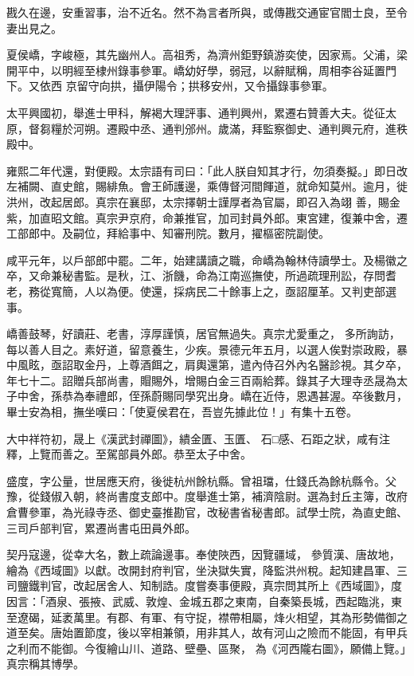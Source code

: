 \begin{pinyinscope}
 戡久在邊，安重習事，治不近名。然不為言者所與，或傳戡交通宦官閻士良，至令妻出見之。



 夏侯嶠，字峻極，其先幽州人。高祖秀，為濟州鉅野鎮游奕使，因家焉。父浦，梁開平中，以明經至棣州錄事參軍。嶠幼好學，弱冠，以辭賦稱，周相李谷延置門下。又依西
 京留守向拱，攝伊陽令；拱移安州，又令攝錄事參軍。



 太平興國初，舉進士甲科，解褐大理評事、通判興州，累遷右贊善大夫。從征太原，督芻糧於河朔。遷殿中丞、通判邠州。歲滿，拜監察御史、通判興元府，進秩殿中。



 雍熙二年代還，對便殿。太宗語有司曰：「此人朕自知其才行，勿須奏擬。」即日改左補闕、直史館，賜緋魚。會王師護邊，乘傳督河間餫道，就命知莫州。逾月，徙洪州，改起居郎。真宗在襄邸，太宗擇朝士謹厚者為官屬，即召入為翊
 善，賜金紫，加直昭文館。真宗尹京府，命兼推官，加司封員外郎。東宮建，復兼中舍，遷工部郎中。及嗣位，拜給事中、知審刑院。數月，擢樞密院副使。



 咸平元年，以戶部郎中罷。二年，始建講讀之職，命嶠為翰林侍讀學士。及楊徽之卒，又命兼秘書監。是秋，江、浙饑，命為江南巡撫使，所過疏理刑訟，存問耆老，務從寬簡，人以為便。使還，採病民二十餘事上之，亟詔厘革。又判吏部選事。



 嶠善鼓琴，好讀莊、老書，淳厚謹慎，居官無過失。真宗尤愛重之，
 多所詢訪，每以善人目之。素好道，留意養生，少疾。景德元年五月，以選人俟對崇政殿，暴中風眩，亟詔取金丹，上尊酒餌之，肩輿還第，遣內侍召外內名醫診視。其夕卒，年七十二。詔贈兵部尚書，賵賜外，增賜白金三百兩給葬。錄其子大理寺丞晟為太子中舍，孫恭為奉禮郎，侄孫蔚賜同學究出身。嶠在近侍，恩遇甚渥。卒後數月，畢士安為相，撫坐嘆曰：「使夏侯君在，吾豈先據此位！」有集十五卷。



 大中祥符初，晟上《漢武封禪圖》，繢金匱、玉匱、
 石□感、石距之狀，咸有注釋，上覽而善之。至駕部員外郎。恭至太子中舍。



 盛度，字公量，世居應天府，後徙杭州餘杭縣。曾祖璫，仕錢氏為餘杭縣令。父豫，從錢俶入朝，終尚書度支郎中。度舉進士第，補濟陰尉。選為封丘主簿，改府倉曹參軍，為光祿寺丞、御史臺推勘官，改秘書省秘書郎。試學士院，為直史館、三司戶部判官，累遷尚書屯田員外郎。



 契丹寇邊，從幸大名，數上疏論邊事。奉使陜西，因覽疆域，
 參質漢、唐故地，繪為《西域圖》以獻。改開封府判官，坐決獄失實，降監洪州稅。起知建昌軍、三司鹽鐵判官，改起居舍人、知制誥。度嘗奏事便殿，真宗問其所上《西域圖》，度因言：「酒泉、張掖、武威、敦煌、金城五郡之東南，自秦築長城，西起臨洮，東至遼碣，延袤萬里。有郡、有軍、有守捉，襟帶相屬，烽火相望，其為形勢備御之道至矣。唐始置節度，後以宰相兼領，用非其人，故有河山之險而不能固，有甲兵之利而不能御。今復繪山川、道路、壁壘、區聚，
 為《河西隴右圖》，願備上覽。」真宗稱其博學。




\end{pinyinscope}
